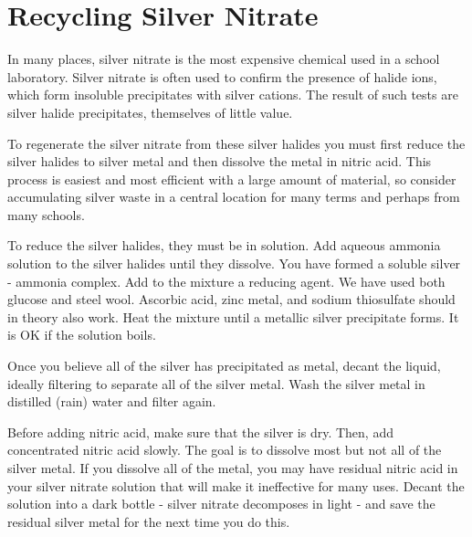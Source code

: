 \chapter{Recycling Silver Nitrate}
\label{cha:recyclesilver}
In many places, 
silver nitrate is the most expensive chemical 
used in a school laboratory. 
Silver nitrate is often used to confirm the presence of halide ions, 
which form insoluble precipitates with silver cations. 
The result of such tests are silver halide precipitates, 
themselves of little value.

To regenerate the silver nitrate from these silver halides 
you must first reduce the silver halides to silver metal 
and then dissolve the metal in nitric acid. 
This process is easiest and most efficient 
with a large amount of material, 
so consider accumulating silver waste in a central location 
for many terms and perhaps from many schools.

To reduce the silver halides, 
they must be in solution. 
Add aqueous ammonia solution to the silver halides until they dissolve. 
You have formed a soluble silver - ammonia complex. 
Add to the mixture a reducing agent. 
We have used both glucose and steel wool. 
Ascorbic acid, 
zinc metal, 
and sodium thiosulfate should in theory also work. 
Heat the mixture until a metallic silver precipitate forms. 
It is OK if the solution boils.

Once you believe all of the silver has precipitated as metal, 
decant the liquid, 
ideally filtering to separate all of the silver metal. 
Wash the silver metal in distilled (rain) water and filter again.

Before adding nitric acid, 
make sure that the silver is dry. 
Then, 
add concentrated nitric acid slowly. 
The goal is to dissolve most but not all of the silver metal. 
If you dissolve all of the metal, 
you may have residual nitric acid in your silver nitrate solution 
that will make it ineffective for many uses. 
Decant the solution into a dark bottle - 
silver nitrate decomposes in light - 
and save the residual silver metal for the next time you do this.
